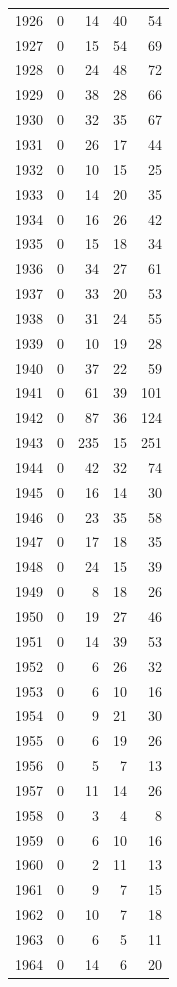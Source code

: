 \documentclass[
]{scrartcl}
\begin{document}
\begin{longtable}{rrrrr}
1926 & 0 & 14 & 40 & 54 \\ 
1927 & 0 & 15 & 54 & 69 \\ 
1928 & 0 & 24 & 48 & 72 \\ 
1929 & 0 & 38 & 28 & 66 \\ 
1930 & 0 & 32 & 35 & 67 \\ 
1931 & 0 & 26 & 17 & 44 \\ 
1932 & 0 & 10 & 15 & 25 \\ 
1933 & 0 & 14 & 20 & 35 \\ 
1934 & 0 & 16 & 26 & 42 \\ 
1935 & 0 & 15 & 18 & 34 \\ 
1936 & 0 & 34 & 27 & 61 \\ 
1937 & 0 & 33 & 20 & 53 \\ 
1938 & 0 & 31 & 24 & 55 \\ 
1939 & 0 & 10 & 19 & 28 \\ 
1940 & 0 & 37 & 22 & 59 \\ 
1941 & 0 & 61 & 39 & 101 \\ 
1942 & 0 & 87 & 36 & 124 \\ 
1943 & 0 & 235 & 15 & 251 \\ 
1944 & 0 & 42 & 32 & 74 \\ 
1945 & 0 & 16 & 14 & 30 \\ 
1946 & 0 & 23 & 35 & 58 \\ 
1947 & 0 & 17 & 18 & 35 \\ 
1948 & 0 & 24 & 15 & 39 \\ 
1949 & 0 & 8 & 18 & 26 \\ 
1950 & 0 & 19 & 27 & 46 \\ 
1951 & 0 & 14 & 39 & 53 \\ 
1952 & 0 & 6 & 26 & 32 \\ 
1953 & 0 & 6 & 10 & 16 \\ 
1954 & 0 & 9 & 21 & 30 \\ 
1955 & 0 & 6 & 19 & 26 \\ 
1956 & 0 & 5 & 7 & 13 \\ 
1957 & 0 & 11 & 14 & 26 \\ 
1958 & 0 & 3 & 4 & 8 \\ 
1959 & 0 & 6 & 10 & 16 \\ 
1960 & 0 & 2 & 11 & 13 \\ 
1961 & 0 & 9 & 7 & 15 \\ 
1962 & 0 & 10 & 7 & 18 \\ 
1963 & 0 & 6 & 5 & 11 \\ 
1964 & 0 & 14 & 6 & 20 \\ 

\end{longtable}
\end{document}
